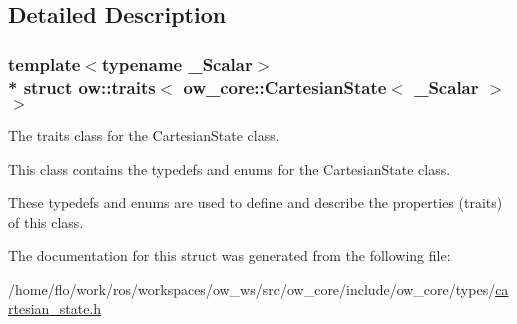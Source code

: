\subsection{Detailed Description}
\subsubsection*{template$<$typename \+\_\+\+Scalar$>$\\*
struct ow\+::traits$<$ ow\+\_\+core\+::\+Cartesian\+State$<$ \+\_\+\+Scalar $>$ $>$}

The traits class for the Cartesian\+State class. 

This class contains the typedefs and enums for the Cartesian\+State class.

These typedefs and enums are used to define and describe the properties (traits) of this class. 

The documentation for this struct was generated from the following file\+:\begin{DoxyCompactItemize}
\item 
/home/flo/work/ros/workspaces/ow\+\_\+ws/src/ow\+\_\+core/include/ow\+\_\+core/types/\hyperlink{cartesian__state_8h}{cartesian\+\_\+state.\+h}\end{DoxyCompactItemize}
